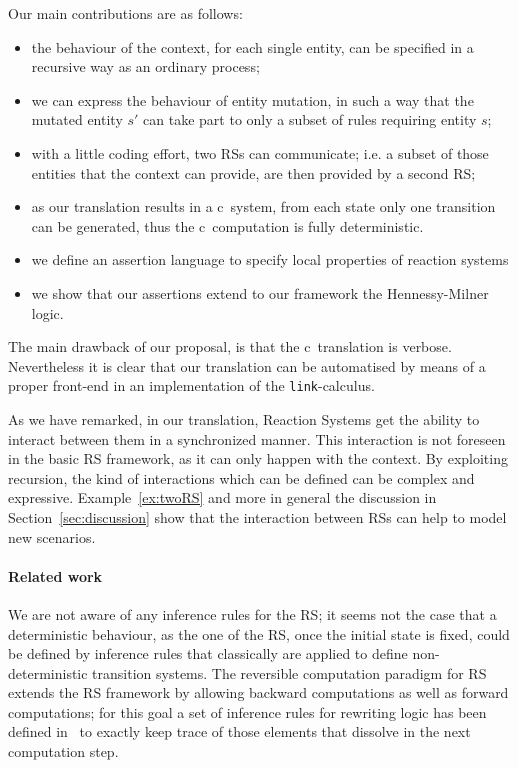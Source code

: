 Our main contributions are as follows:
\begin{itemize}
\item the behaviour of the context, for each single 
entity,
can be
specified in a recursive way as an ordinary process;
\item we can express the behaviour of entity mutation,
in such a way that the mutated entity
$s'$ can  take part to only a subset of rules requiring entity $s$;
\item with a little coding effort, two RSs can
communicate; i.e.  a subset of those entities that the context  can
provide, are then provided by a second RS;
\item as our translation results in  a  c\CNA \ system, from
each state only one transition can be generated, thus the c\CNA \
computation is fully deterministic.
\item we define an assertion language to specify local properties of 
reaction systems
\item we show that our assertions extend to our framework the Hennessy-Milner logic.
\end{itemize}

The main drawback of our proposal, is that the c\CNA \ translation is
verbose. Nevertheless it is clear that our
translation can be automatised by means of a proper front-end in
an implementation of the {\tt link}-calculus.

As we have remarked, in our translation, Reaction Systems 
get the ability to interact between them in a synchronized manner. 
This interaction is not foreseen in
the basic RS framework, as it can only happen with the context.
By exploiting recursion, the kind of interactions which can be 
defined can be complex and expressive.
Example~\ref{ex:twoRS} and more in general the discussion in 
Section~\ref{sec:discussion} show that 
the interaction between RSs can help to model new scenarios.
\paragraph{Related work}
We are not aware of any inference rules for the RS; it seems not the case
that a deterministic behaviour, as the one of the RS, once the initial state is 
fixed, could be defined by inference rules that classically are applied 
to define non-deterministic transition systems.
The reversible computation paradigm for RS extends the RS framework  by
allowing  backward computations as well as forward computations; for this 
goal a set of inference rules for rewriting logic has been 
defined in~\cite{10.1007/978-3-319-73359-3_3}
to exactly keep trace of those elements that  dissolve in the next 
computation step.


